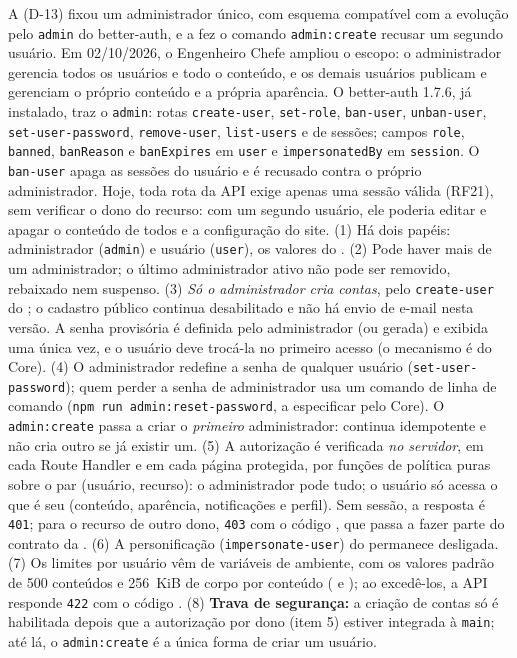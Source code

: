 {A  (D-13) fixou um administrador único, com esquema compatível com a evolução pelo  \texttt{admin} do better-auth, e a  fez o comando \texttt{admin:create} recusar um segundo usuário. Em 02/10/2026, o Engenheiro Chefe ampliou o escopo: o administrador gerencia todos os usuários e todo o conteúdo, e os demais usuários publicam e gerenciam o próprio conteúdo e a própria aparência. O better-auth 1.7.6, já instalado, traz o  \texttt{admin}: rotas \texttt{create-user}, \texttt{set-role}, \texttt{ban-user}, \texttt{unban-user}, \texttt{set-user-password}, \texttt{remove-user}, \texttt{list-users} e de sessões; campos \texttt{role}, \texttt{banned}, \texttt{banReason} e \texttt{banExpires} em \texttt{user} e \texttt{impersonatedBy} em \texttt{session}. O \texttt{ban-user} apaga as sessões do usuário e é recusado contra o próprio administrador. Hoje, toda rota da API exige apenas uma sessão válida (RF21), sem verificar o dono do recurso: com um segundo usuário, ele poderia editar e apagar o conteúdo de todos e a configuração do site.}
{(1) Há dois papéis: administrador (\texttt{admin}) e usuário (\texttt{user}), os valores do . (2) Pode haver mais de um administrador; o último administrador ativo não pode ser removido, rebaixado nem suspenso. (3) \emph{Só o administrador cria contas}, pelo \texttt{create-user} do ; o cadastro público continua desabilitado e não há envio de e-mail nesta versão. A senha provisória é definida pelo administrador (ou gerada) e exibida uma única vez, e o usuário deve trocá-la no primeiro acesso (o mecanismo é do Core). (4) O administrador redefine a senha de qualquer usuário (\texttt{set-user-password}); quem perder a senha de administrador usa um comando de linha de comando (\texttt{npm run admin:reset-password}, a especificar pelo Core). O \texttt{admin:create} passa a criar o \emph{primeiro} administrador: continua idempotente e não cria outro se já existir um. (5) A autorização é verificada \emph{no servidor}, em cada Route Handler e em cada página protegida, por funções de política puras sobre o par (usuário, recurso): o administrador pode tudo; o usuário só acessa o que é seu (conteúdo, aparência, notificações e perfil). Sem sessão, a resposta é \texttt{401}; para o recurso de outro dono, \texttt{403} com o código , que passa a fazer parte do contrato da . (6) A personificação (\texttt{impersonate-user}) do  permanece desligada. (7) Os limites por usuário vêm de variáveis de ambiente, com os valores padrão de 500 conteúdos e 256~KiB de corpo por conteúdo ( e ); ao excedê-los, a API responde \texttt{422} com o código . (8) \textbf{Trava de segurança:} a criação de contas só é habilitada depois que a autorização por dono (item 5) estiver integrada à \texttt{main}; até lá, o \texttt{admin:create} é a única forma de criar um usuário.}
